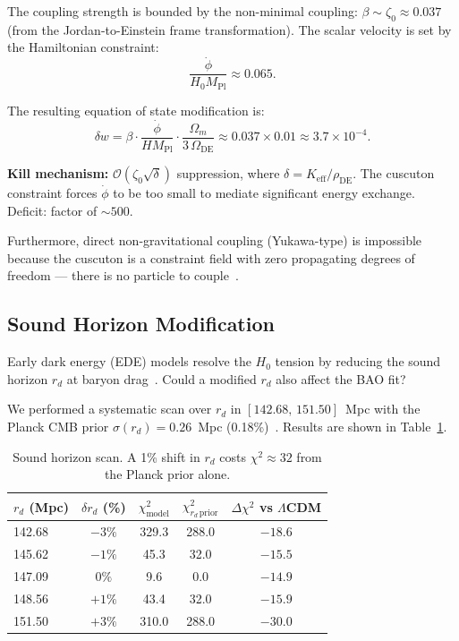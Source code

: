The coupling strength is bounded by the non-minimal coupling: $\beta \sim \zeta_0 \approx 0.037$ (from the Jordan-to-Einstein frame transformation). The scalar velocity is set by the Hamiltonian constraint:
\begin{equation}
  \frac{\dot{\phi}}{H_0 M_{\mathrm{Pl}}} \approx 0.065.
  \label{eq:3-12}
\end{equation}

The resulting equation of state modification is:
\begin{equation}
  \delta w = \beta \cdot \frac{\dot{\phi}}{H M_{\mathrm{Pl}}} \cdot \frac{\Omega_m}{3\,\Omega_{\mathrm{DE}}}
    \approx 0.037 \times 0.01 \approx 3.7 \times 10^{-4}.
  \label{eq:3-13}
\end{equation}

\textbf{Kill mechanism:} $\mathcal{O}(\zeta_0 \sqrt{\delta})$ suppression, where $\delta = K_{\mathrm{eff}}/\rho_{\mathrm{DE}}$. The cuscuton constraint forces $\dot{\phi}$ to be too small to mediate significant energy exchange. Deficit: factor of ${\sim}500$.

Furthermore, direct non-gravitational coupling (Yukawa-type) is impossible because the cuscuton is a constraint field with zero propagating degrees of freedom --- there is no particle to couple~\cite{ch3:derham2016}.

\subsection{Sound Horizon Modification}
\label{sec:3-soundhorizon}

Early dark energy (EDE) models resolve the $H_0$ tension by reducing the sound horizon $r_d$ at baryon drag~\cite{ch3:poulin2019}. Could a modified $r_d$ also affect the BAO fit?

We performed a systematic scan over $r_d$ in $[142.68,\, 151.50]$~Mpc with the Planck CMB prior $\sigma(r_d) = 0.26$~Mpc (0.18\%)~\cite{ch3:planck2018}. Results are shown in Table~\ref{tab:3-soundhorizon}.

\begin{table}[htbp]
\centering
\caption{Sound horizon scan. A 1\% shift in $r_d$ costs $\chi^2 \approx 32$ from the Planck prior alone.}
\label{tab:3-soundhorizon}
\begin{tabular}{@{}lcccc@{}}
\toprule
$r_d$ (Mpc) & $\delta r_d$ (\%) & $\chi^2_{\mathrm{model}}$ & $\chi^2_{r_d\,\mathrm{prior}}$ & $\Delta\chi^2$ vs $\Lambda$CDM \\
\midrule
142.68 & $-3\%$ & 329.3 & 288.0 & $-18.6$ \\
145.62 & $-1\%$ & 45.3  & 32.0  & $-15.5$ \\
147.09 & $0\%$  & 9.6   & 0.0   & $-14.9$ \\
148.56 & $+1\%$ & 43.4  & 32.0  & $-15.9$ \\
151.50 & $+3\%$ & 310.0 & 288.0 & $-30.0$ \\
\bottomrule
\end{tabular}
\end{table}

